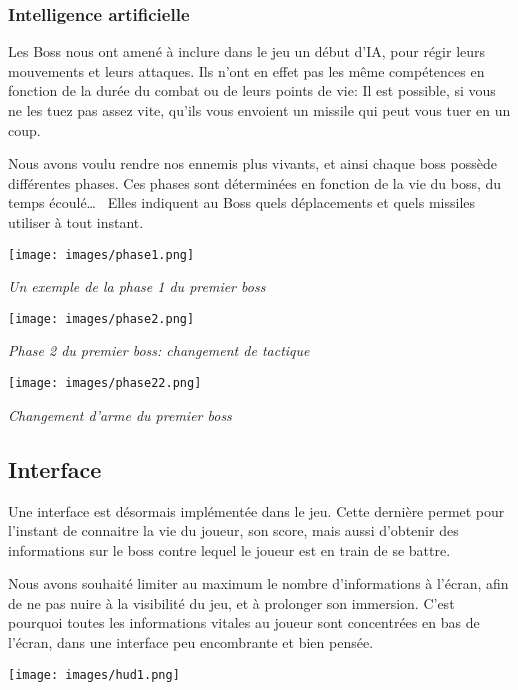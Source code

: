 \documentclass[12pt,a4paper]{article}
\begin{document}
		\subsubsection{Intelligence artificielle}
		\par
		Les Boss nous ont amené à inclure dans le jeu un début d'IA, pour régir leurs mouvements et leurs attaques.
		Ils n'ont en effet pas les même compétences en fonction de la durée du combat ou de leurs points de vie:
		Il est possible, si vous ne les tuez pas assez vite, qu'ils vous envoient un missile qui peut vous tuer en un coup.
		\par
		Nous avons voulu rendre nos ennemis plus vivants, et ainsi chaque boss possède différentes phases. 
		Ces phases sont déterminées en fonction de la vie du boss, du temps écoulé\ldots~ Elles indiquent au Boss quels déplacements et quels missiles utiliser à tout instant.
		\begin{center}
			\vspace{1cm}
			
			\texttt{[image: images/phase1.png]}
			\par \emph{Un exemple de la phase 1 du premier boss}
			
			\vspace{0.4cm}
	
			\texttt{[image: images/phase2.png]}
			\par \emph{Phase 2 du premier boss: changement de tactique}
	
			\vspace{0.4cm}
			
			\texttt{[image: images/phase22.png]}
			\par \emph{Changement d'arme du premier boss}
			
			\vspace{0.4cm}
		\end{center}
		
		\subsection{Interface}
		\par
		Une interface est désormais implémentée dans le jeu.
		Cette dernière permet pour l'instant de connaitre la vie du joueur, son score, mais aussi d'obtenir des informations sur le boss contre lequel le joueur est en train de se battre.
		\par
		Nous avons souhaité limiter au maximum le nombre d'informations à l'écran, afin de ne pas nuire à la visibilité du jeu, et à prolonger son immersion.
		C'est pourquoi toutes les informations vitales au joueur sont concentrées en bas de l'écran, dans une interface peu encombrante et bien pensée.
		\begin{center}
		\vspace{1cm}
		\texttt{[image: images/hud1.png]}
		\vspace{1cm}
		\end{center}
		
\end{document}
